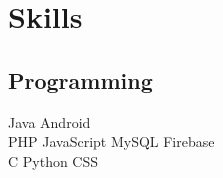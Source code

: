 \documentclass[]{deedy-resume-openfont}
\begin{document}
\begin{minipage}[t]{0.48\textwidth}

\section{Skills}
\subsection{Programming}
Java \textbullet{}   Android \\ 
PHP \textbullet{} JavaScript \textbullet{} MySQL \textbullet{} Firebase \\
C \textbullet{} Python \textbullet{} CSS
\sectionsep

%
%

\end{minipage} 
\hfill
\end{document}

